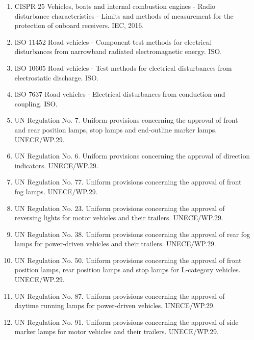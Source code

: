 \begin{enumerate}[leftmargin=2em]
    \item CISPR 25 Vehicles, boats and internal combustion engines - Radio disturbance characteristics - Limits and methods of measurement for the protection of onboard receivers. IEC, 2016.

    \item ISO 11452 Road vehicles - Component test methods for electrical disturbances from narrowband radiated electromagnetic energy. ISO.

    \item ISO 10605 Road vehicles - Test methods for electrical disturbances from electrostatic discharge. ISO.

    \item ISO 7637 Road vehicles - Electrical disturbances from conduction and coupling. ISO.

    \item UN Regulation No. 7. Uniform provisions concerning the approval of front and rear position lamps, stop lamps and end-outline marker lamps. UNECE/WP.29.

    \item UN Regulation No. 6. Uniform provisions concerning the approval of direction indicators. UNECE/WP.29.

    \item UN Regulation No. 77. Uniform provisions concerning the approval of front fog lamps. UNECE/WP.29.

    \item UN Regulation No. 23. Uniform provisions concerning the approval of reversing lights for motor vehicles and their trailers. UNECE/WP.29.

    \item UN Regulation No. 38. Uniform provisions concerning the approval of rear fog lamps for power-driven vehicles and their trailers. UNECE/WP.29.

    \item UN Regulation No. 50. Uniform provisions concerning the approval of front position lamps, rear position lamps and stop lamps for L-category vehicles. UNECE/WP.29.

    \item UN Regulation No. 87. Uniform provisions concerning the approval of daytime running lamps for power-driven vehicles. UNECE/WP.29.

    \item UN Regulation No. 91. Uniform provisions concerning the approval of side marker lamps for motor vehicles and their trailers. UNECE/WP.29.


\end{enumerate}

